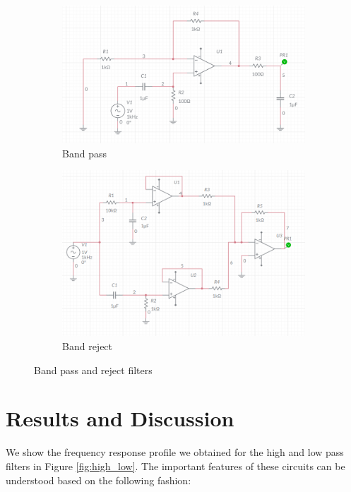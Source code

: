 \documentclass{article}
\begin{document}
	\begin{figure}[h!]
		\centering
		\begin{subfigure}{0.48\textwidth}
			\includegraphics[width=\textwidth]{band_pass_circuit}
			\caption{Band pass}
		\end{subfigure}
		
		\begin{subfigure}{0.48\textwidth}
			\includegraphics[width=\textwidth]{band_reject_schematic}
			\caption{Band reject}
		\end{subfigure}
		\caption{Band pass and reject filters}	
	\end{figure}

	\pagebreak
	
	\section*{Results and Discussion}
	\label{sect:results}
	
	We show the frequency response profile we obtained for the high and low pass filters in Figure \ref{fig:high_low}. The important features of these circuits can be understood based on the following fashion:\\
	
\end{document}
